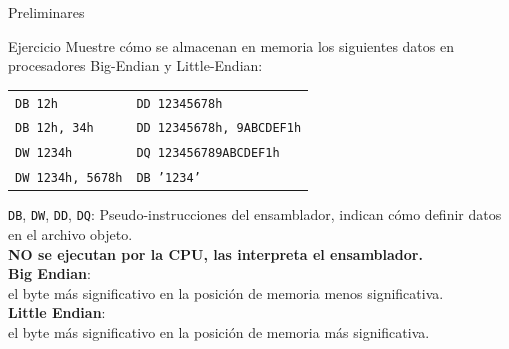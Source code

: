 \documentclass[aspectratio=169]{beamer}
\begin{document}
\begin{frame}[t]{Preliminares}
    \begin{block}{Ejercicio}
    Muestre cómo se almacenan en memoria los siguientes datos en procesadores Big-Endian y Little-Endian:
    \begin{center}
    \vspace{-0.5cm}
    \begin{tabular}{ll}
    \texttt{DB 12h}           & \texttt{DD 12345678h}            \\
    \texttt{DB 12h, 34h}      & \texttt{DD 12345678h, 9ABCDEF1h} \\
    \texttt{DW 1234h}         & \texttt{DQ 123456789ABCDEF1h}    \\
    \texttt{DW 1234h, 5678h}  & \texttt{DB ’1234’}               \\
    \end{tabular}
    \vspace{-0.4cm}
    \end{center}
    \end{block}
    \pause
    \texttt{DB}, \texttt{DW}, \texttt{DD}, \texttt{DQ}: Pseudo-instrucciones del ensamblador, indican cómo definir datos en el archivo objeto.\\ 
    \small \textbf{NO se ejecutan por la CPU, las interpreta el ensamblador.}\\
    \bigskip
    \pause
    \textbf{Big Endian}:   \\ \hspace{0.5cm} el byte más significativo en la posición de memoria menos significativa.\\
    \textbf{Little Endian}:\\ \hspace{0.5cm} el byte más significativo en la posición de memoria más significativa.
\end{frame}
\end{document}
